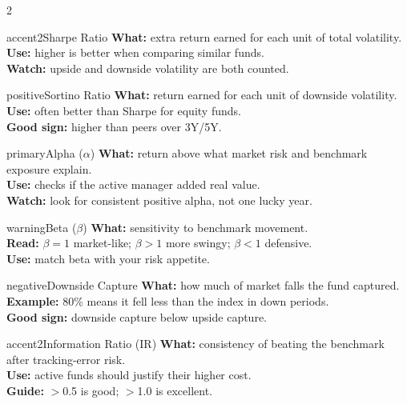 \documentclass[11pt,a4paper]{article}
\begin{document}
\begin{multicols}{2}
\begin{riskratio}{accent2}{Sharpe Ratio}{}
\textbf{What:} extra return earned for each unit of total volatility.\\
\textbf{Use:} higher is better when comparing similar funds.\\
\textbf{Watch:} upside and downside volatility are both counted.
\end{riskratio}

\begin{riskratio}{positive}{Sortino Ratio}{}
\textbf{What:} return earned for each unit of downside volatility.\\
\textbf{Use:} often better than Sharpe for equity funds.\\
\textbf{Good sign:} higher than peers over 3Y/5Y.
\end{riskratio}

\begin{riskratio}{primary}{Alpha ($\alpha$)}{}
\textbf{What:} return above what market risk and benchmark exposure explain.\\
\textbf{Use:} checks if the active manager added real value.\\
\textbf{Watch:} look for consistent positive alpha, not one lucky year.
\end{riskratio}

\begin{riskratio}{warning}{Beta ($\beta$)}{}
\textbf{What:} sensitivity to benchmark movement.\\
\textbf{Read:} $\beta=1$ market-like; $\beta>1$ more swingy; $\beta<1$ defensive.\\
\textbf{Use:} match beta with your risk appetite.
\end{riskratio}

\begin{riskratio}{negative}{Downside Capture}{}
\textbf{What:} how much of market falls the fund captured.\\
\textbf{Example:} 80\% means it fell less than the index in down periods.\\
\textbf{Good sign:} downside capture below upside capture.
\end{riskratio}

\begin{riskratio}{accent2}{Information Ratio (IR)}{}
\textbf{What:} consistency of beating the benchmark after tracking-error risk.\\
\textbf{Use:} active funds should justify their higher cost.\\
\textbf{Guide:} $>$0.5 is good; $>$1.0 is excellent.
\end{riskratio}
\end{multicols}
\end{document}
